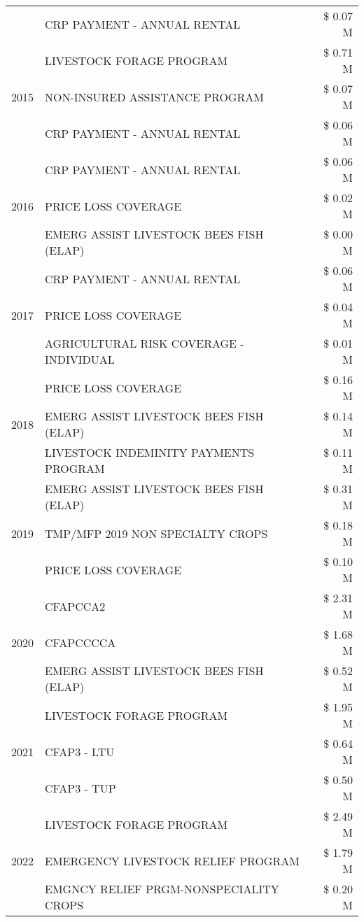\begin{tabular}{llr}
 & CRP PAYMENT - ANNUAL RENTAL & \$ 0.07 M \\
\cline{1-3}
\multirow[t]{3}{*}{2015} & LIVESTOCK FORAGE PROGRAM & \$ 0.71 M \\
 & NON-INSURED ASSISTANCE PROGRAM & \$ 0.07 M \\
 & CRP PAYMENT - ANNUAL RENTAL & \$ 0.06 M \\
\cline{1-3}
\multirow[t]{3}{*}{2016} & CRP PAYMENT - ANNUAL RENTAL & \$ 0.06 M \\
 & PRICE LOSS COVERAGE & \$ 0.02 M \\
 & EMERG ASSIST LIVESTOCK BEES FISH (ELAP) & \$ 0.00 M \\
\cline{1-3}
\multirow[t]{3}{*}{2017} & CRP PAYMENT - ANNUAL RENTAL & \$ 0.06 M \\
 & PRICE LOSS COVERAGE & \$ 0.04 M \\
 & AGRICULTURAL RISK COVERAGE - INDIVIDUAL & \$ 0.01 M \\
\cline{1-3}
\multirow[t]{3}{*}{2018} & PRICE LOSS COVERAGE & \$ 0.16 M \\
 & EMERG ASSIST LIVESTOCK BEES FISH (ELAP) & \$ 0.14 M \\
 & LIVESTOCK INDEMINITY PAYMENTS PROGRAM & \$ 0.11 M \\
\cline{1-3}
\multirow[t]{3}{*}{2019} & EMERG ASSIST LIVESTOCK BEES FISH (ELAP) & \$ 0.31 M \\
 & TMP/MFP 2019 NON SPECIALTY CROPS & \$ 0.18 M \\
 & PRICE LOSS COVERAGE & \$ 0.10 M \\
\cline{1-3}
\multirow[t]{3}{*}{2020} & CFAPCCA2 & \$ 2.31 M \\
 & CFAPCCCCA & \$ 1.68 M \\
 & EMERG ASSIST LIVESTOCK BEES FISH (ELAP) & \$ 0.52 M \\
\cline{1-3}
\multirow[t]{3}{*}{2021} & LIVESTOCK FORAGE PROGRAM & \$ 1.95 M \\
 & CFAP3 - LTU & \$ 0.64 M \\
 & CFAP3 - TUP & \$ 0.50 M \\
\cline{1-3}
\multirow[t]{3}{*}{2022} & LIVESTOCK FORAGE PROGRAM & \$ 2.49 M \\
 & EMERGENCY LIVESTOCK RELIEF PROGRAM & \$ 1.79 M \\
 & EMGNCY RELIEF PRGM-NONSPECIALITY CROPS & \$ 0.20 M \\
\cline{1-3}
\bottomrule
\end{tabular}
